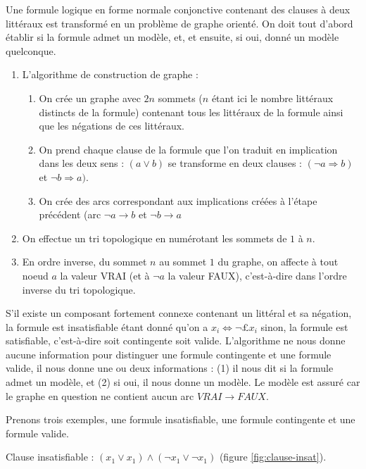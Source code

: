 \documentclass{article}
\begin{document}
Une formule logique en forme normale conjonctive contenant des clauses à deux littéraux est transformé en un problème de graphe orienté. On doit tout d'abord établir si la formule admet un modèle, et, et ensuite, si oui, donné un modèle quelconque.

\begin{enumerate}
\item L'algorithme de construction de graphe : 
\begin{enumerate}
\item On crée un graphe avec $2n$ sommets ($n$ étant ici le nombre littéraux distincts de la formule) contenant tous les littéraux de la formule ainsi que les négations de ces littéraux.
\item On prend chaque clause de la formule que l'on traduit en implication dans les deux sens : $(a \vee b)$ 
se transforme en deux clauses : $(\neg a \Rightarrow b)$ et $\neg b \Rightarrow a)$.
\item On crée des arcs correspondant aux implications créées à l'étape précédent (arc $\neg a 
\rightarrow b$ et $\neg b \rightarrow a$
\end{enumerate}
\item On effectue un tri topologique en numérotant les sommets de $1$ à $n$.
\item En ordre inverse, du sommet $n$ au sommet $1$ du graphe, on affecte à tout noeud $a$ la valeur VRAI (et à $\neg a$ la valeur FAUX), c'est-à-dire dans l'ordre inverse du tri topologique.
\end{enumerate}  	

S'il existe un composant fortement connexe contenant un littéral et sa négation, la formule est insatisfiable étant donné qu'on a $x_{i} \Leftrightarrow \neg £x_{i}$ sinon, la formule est satisfiable, c'est-à-dire soit contingente soit valide. L'algorithme ne nous donne aucune information pour distinguer une formule contingente et une formule valide, il nous donne une ou deux informations : (1) il nous dit si la formule admet un modèle, et (2) si oui, il nous donne un modèle. Le modèle est assuré car le graphe en question ne contient aucun arc $VRAI \rightarrow FAUX$.

Prenons trois exemples, une formule insatisfiable, une formule contingente et une formule valide.

Clause insatisfiable : $(x_{1} \vee x_{1}) \wedge (\neg x_{1} \vee \neg x_{1})$ (figure \ref{fig:clause-insat}).
\end{document}
